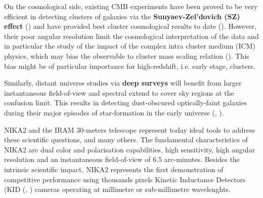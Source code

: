 \documentclass[]{aa} %
\begin{document}
On the cosmological side, existing CMB experiments have been proved to be very efficient in detecting clusters of galaxies via the \textbf{Sunyaev-Zel\textquoteright dovich (SZ) effect} (\cite{plancksz2,actsz,sptsz}) and have provided best cluster cosmological results to date (\cite{plancksp2,plancknc2}). However, their poor angular resolution limit the cosmological interpretation of the data and in particular the study of the impact of the complex intra cluster medium (ICM) physics, which may bias the observable to cluster mass scaling relation (\cite{plancknc2}). This bias might be of particular importance for high-redshift, i.e. early stage, clusters. 

Similarly, distant universe studies via \textbf{deep surveys} will benefit from larger instantaneous field-of-view and spectral extend to cover sky regions at the confusion limit. This results in detecting dust-obscured optically-faint galaxies during their major episodes of star-formation in the early universe (\cite{Bethermin2017}, \cite{Geach2017}). 

NIKA2 and the IRAM 30-meters telescope represent today ideal tools to address these scientific questions, and many others. The fundamental characteristics of NIKA2 are dual color and polarisation capabilities, high sensitivity, high angular resolution and an instantaneous field-of-view of 6.5 arc-minutes. Besides the intrinsic scientific impact, NIKA2 represents the first demonstration of competitive performance using thousands pixels Kinetic Inductance Detectors (KID (\cite{Day2003}, \cite{Doyle2010}) cameras operating at millimetre or sub-millimetre wavelenghts.

\end{document}
